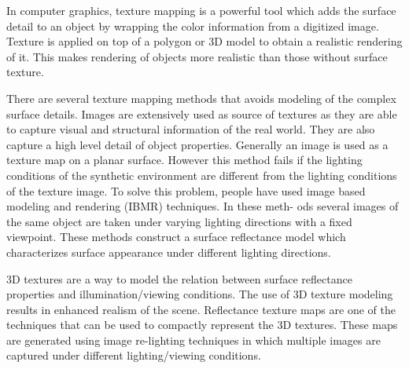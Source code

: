 In computer graphics, 
texture mapping is a powerful tool which adds the surface detail to an object by wrapping
the color information from a digitized image. 
Texture is applied on top of a
polygon or 3D model to obtain a realistic rendering of it.
This makes rendering of objects more realistic than those without
surface texture. 

There are several texture mapping methods that avoids
modeling of the complex surface details. 
Images are extensively
used as source of textures as they are able to capture visual and structural information of the real world. They
are also capture a high level detail of object properties.
Generally an image is used as a texture map
on a planar surface. However this method fails if the lighting conditions of the synthetic
environment are different from the lighting conditions of the texture image. To solve this
problem, people have used image based modeling and rendering (IBMR) techniques. In these meth-
ods several images of the same object are taken under varying lighting directions with a fixed
viewpoint. These methods construct a surface reflectance model which characterizes surface
appearance under different lighting directions. 

3D textures are a way to model the relation between surface reflectance
properties and illumination/viewing conditions. The use of 3D texture modeling
results in enhanced realism of the scene. Reflectance texture maps are one of
the techniques that can be used to compactly represent the 3D textures. These
maps are generated using image re-lighting techniques in which
multiple images are captured under different lighting/viewing conditions.


